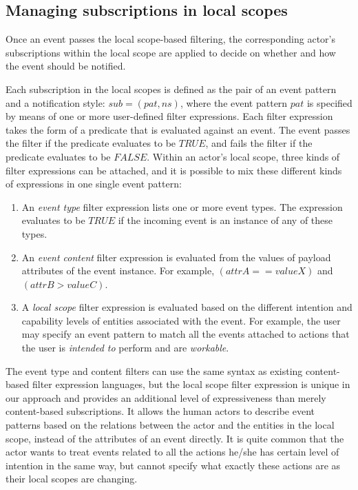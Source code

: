 \subsection{Managing subscriptions in local scopes} %
\label{sub:managing_subscriptions}
Once an event passes the local scope-based filtering, the corresponding actor's subscriptions within the local scope are applied to decide on whether and how the event should be notified. 

Each subscription in the local scopes is defined as the pair of an event pattern and a notification style: $sub=(pat, ns)$, where the event pattern $pat$ is specified by means of one or more user-defined filter expressions. Each filter expression takes the form of a predicate that is evaluated against an event. The event passes the filter if the predicate evaluates to be $TRUE$, and fails the filter if the predicate evaluates to be $FALSE$. Within an actor's local scope, three kinds of filter expressions can be attached, and it is possible to mix these different kinds of expressions in one single event pattern:

\begin{enumerate}
	\item An \emph{event type} filter expression lists one or more event types. The expression evaluates to be $TRUE$ if the incoming event is an instance of any of these types.
	\item An \emph{event content} filter expression is evaluated from the values of payload attributes of the event instance. For example, $(attrA == valueX)$ and $(attrB > valueC)$.
	\item A \emph{local scope} filter expression is evaluated based on the different intention and capability levels of entities associated with the event. For example, the user may specify an event pattern to match all the events attached to actions that the user is \emph{intended to} perform and are \emph{workable}.
\end{enumerate}

The event type and content filters can use the same syntax as existing content-based filter expression languages, but the local scope filter expression is unique in our approach and provides an additional level of expressiveness than merely content-based subscriptions. It allows the human actors to describe event patterns based on the relations between the actor and the entities in the local scope, instead of the attributes of an event directly. It is quite common that the actor wants to treat events related to all the actions he/she has certain level of intention in the same way, but cannot specify what exactly these actions are as their local scopes are changing.

